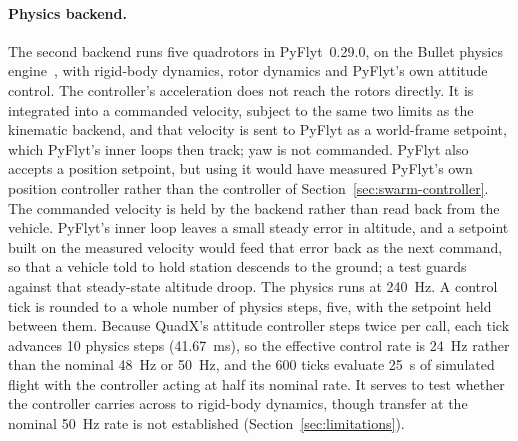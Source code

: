 \paragraph{Physics backend.} The second backend runs five quadrotors in PyFlyt~0.29.0, on the Bullet
physics engine~\cite{pyflyt}, with rigid-body dynamics, rotor dynamics and PyFlyt's own attitude
control. The controller's acceleration does not reach the rotors directly. It is integrated into a
commanded velocity, subject to the same two limits as the kinematic backend, and that velocity is
sent to PyFlyt as a world-frame setpoint, which PyFlyt's inner loops then track; yaw is not
commanded. PyFlyt also accepts a position setpoint, but using it would have measured PyFlyt's own
position controller rather than the controller of Section~\ref{sec:swarm-controller}. The commanded
velocity is held by the backend rather than read back from the vehicle. PyFlyt's inner loop leaves a
small steady error in altitude, and a setpoint built on the measured velocity would feed that error
back as the next command, so that a vehicle told to hold station descends to the ground; a test guards
against that steady-state altitude droop. The physics runs at 240~Hz. A control tick is rounded to
a whole number of physics steps, five, with the setpoint held between them. Because QuadX's attitude
controller steps twice per call, each tick advances 10 physics steps (41.67~ms), so the effective
control rate is 24~Hz rather than the nominal 48~Hz or 50~Hz, and the 600 ticks evaluate 25~s of
simulated flight with the controller acting at half its nominal rate. It serves to test whether
the controller carries across to rigid-body dynamics, though transfer at the nominal 50~Hz rate is
not established (Section~\ref{sec:limitations}).

